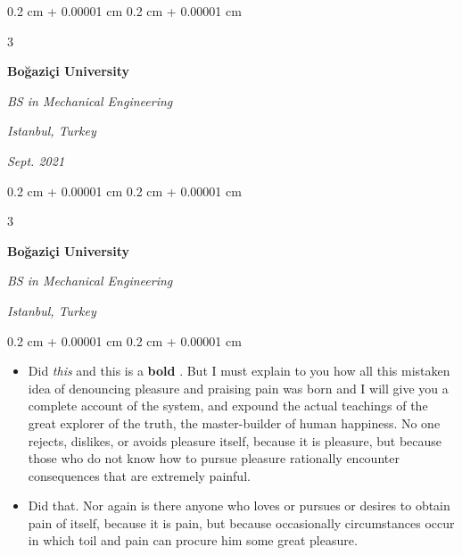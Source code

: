 \documentclass[10pt, letterpaper]{article}
\newenvironment{highlights}{
    \begin{itemize}[
        topsep=0.10 cm,
        parsep=0.10 cm,
        partopsep=0pt,
        itemsep=0pt,
        leftmargin=0.4 cm + 10pt + 0.6 cm
    ]
}{
    \end{itemize}
} %
\newenvironment{onecolentry}{
    \begin{adjustwidth}{
        0.2 cm + 0.00001 cm
    }{
        0.2 cm + 0.00001 cm
    }
}{
    \end{adjustwidth}
} %
\newenvironment{threecolentry}[3][]{
    \onecolentry
    \def\thirdColumn{#3}
    \setcolumnwidth{0.6 cm, \fill, 4.5 cm}
    \begin{paracol}{3}
    #2 \switchcolumn
}{
    \switchcolumn \raggedleft \thirdColumn
    \end{paracol}
    \endonecolentry
} %
\let\hrefWithoutArrow\href
\renewcommand{\href}[2]{\hrefWithoutArrow{#1}{\mbox{\ifthenelse{\equal{#2}{}}{ }{#2 }\raisebox{.15ex}{\footnotesize \faExternalLink*}}}}
\begin{document}
        \vspace{0.2 cm-3px}

        \begin{threecolentry}{
            \vspace*{\fill}
            \textbullet
            \vspace*{3px}
            \vspace*{\fill}
        }{
        \textit{Istanbul, Turkey}    
            
        \textit{Sept. 2021}}
            \textbf{Boğaziçi University}

            \textit{BS in Mechanical Engineering}
        \end{threecolentry}



        \vspace{0.2 cm-3px}

        \begin{threecolentry}{
            \vspace*{\fill}
            \textbullet
            \vspace*{3px}
            \vspace*{\fill}
        }{
        \textit{Istanbul, Turkey}    
            
        }
            \textbf{Boğaziçi University}

            \textit{BS in Mechanical Engineering}
        \end{threecolentry}

        \vspace{0.10 cm-3px}
        \begin{onecolentry}
            \begin{highlights}
                \item Did \textit{this} and this is a \textbf{bold} \href{https://example.com}{link}. But I must explain to you how all this mistaken idea of denouncing pleasure and praising pain was born and I will give you a complete account of the system, and expound the actual teachings of the great explorer of the truth, the master-builder of human happiness. No one rejects, dislikes, or avoids pleasure itself, because it is pleasure, but because those who do not know how to pursue pleasure rationally encounter consequences that are extremely painful.
                \item Did that. Nor again is there anyone who loves or pursues or desires to obtain pain of itself, because it is pain, but because occasionally circumstances occur in which toil and pain can procure him some great pleasure.
            \end{highlights}
        \end{onecolentry}
\end{document}

